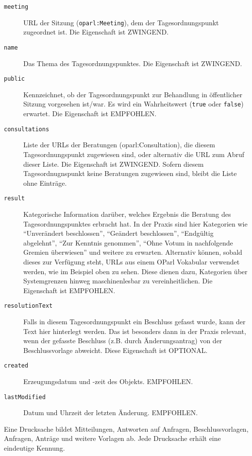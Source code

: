\documentclass[,a4paper]{article}
\begin{document}
\begin{description}
\item[\texttt{meeting}]
URL der Sitzung (\texttt{oparl:Meeting}), dem der Tagesordnungspunkt
zugeordnet ist. Die Eigenschaft ist ZWINGEND.
\item[\texttt{name}]
Das Thema des Tagesordnungspunktes. Die Eigenschaft ist ZWINGEND.
\item[\texttt{public}]
Kennzeichnet, ob der Tagesordnungspunkt zur Behandlung in öffentlicher
Sitzung vorgesehen ist/war. Es wird ein Wahrheitswert (\texttt{true}
oder \texttt{false}) erwartet. Die Eigenschaft ist EMPFOHLEN.
\item[\texttt{consultations}]
Liste der URLs der Beratungen (oparl:Consultation), die diesem
Tagesordnungspunkt zugewiesen sind, oder alternativ die URL zum Abruf
dieser Liste. Die Eigenschaft ist ZWINGEND. Sofern diesem
Tagesordnugnspunkt keine Beratungen zugewiesen sind, bleibt die Liste
ohne Einträge.
\item[\texttt{result}]
Kategorische Information darüber, welches Ergebnis die Beratung des
Tagesordnungspunktes erbracht hat. In der Praxis sind hier Kategorien
wie ``Unverändert beschlossen'', ``Geändert beschlossen'', ``Endgültig
abgelehnt'', ``Zur Kenntnis genommen'', ``Ohne Votum in nachfolgende
Gremien überwiesen'' und weitere zu erwarten. Alternativ können, sobald
dieses zur Verfügung steht, URLs aus einem OParl Vokabular verwendet
werden, wie im Beispiel oben zu sehen. Diese dienen dazu, Kategorien
über Systemgrenzen hinweg maschinenlesbar zu vereinheitlichen. Die
Eigenschaft ist EMPFOHLEN.
\item[\texttt{resolutionText}]
Falls in diesem Tagesordnungspunkt ein Beschluss gefasst wurde, kann der
Text hier hinterlegt werden. Das ist besonders dann in der Praxis
relevant, wenn der gefasste Beschluss (z.B. durch Änderungsantrag) von
der Beschlussvorlage abweicht. Diese Eigenschaft ist OPTIONAL.
\item[\texttt{created}]
Erzeugungsdatum und -zeit des Objekts. EMPFOHLEN.
\item[\texttt{lastModified}]
Datum und Uhrzeit der letzten Änderung. EMPFOHLEN.
\end{description}


Eine Drucksache bildet Mitteilungen, Antworten auf Anfragen,
Beschlussvorlagen, Anfragen, Anträge und weitere Vorlagen ab. Jede
Drucksache erhält eine eindeutige Kennung.
\end{document}
